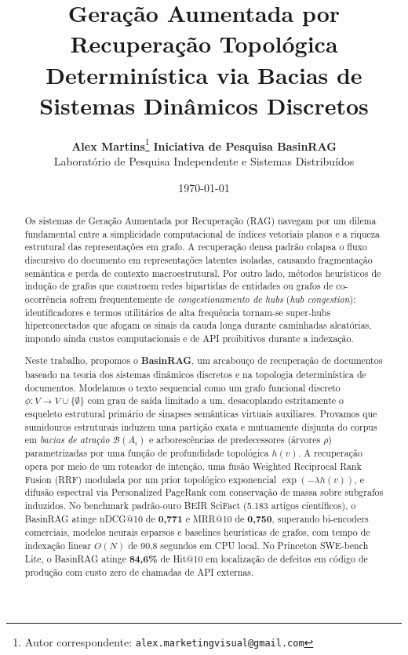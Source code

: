 \documentclass[10pt,twocolumn]{article}
\title{\textbf{Geração Aumentada por Recuperação Topológica Determinística via Bacias de Sistemas Dinâmicos Discretos}}
\author{
    \textbf{Alex Martins}\thanks{Autor correspondente: \texttt{alex.marketingvisual@gmail.com}} \quad \textbf{Iniciativa de Pesquisa BasinRAG} \\
    \small Laboratório de Pesquisa Independente e Sistemas Distribuídos
}
\date{\today}
\theoremstyle{definition}
\begin{document}
\maketitle

\begin{abstract}
Os sistemas de Geração Aumentada por Recuperação (RAG) navegam por um dilema fundamental entre a simplicidade computacional de índices vetoriais planos e a riqueza estrutural das representações em grafo. A recuperação densa padrão colapsa o fluxo discursivo do documento em representações latentes isoladas, causando fragmentação semântica e perda de contexto macroestrutural. Por outro lado, métodos heurísticos de indução de grafos que constroem redes bipartidas de entidades ou grafos de co-ocorrência sofrem frequentemente de \textit{congestionamento de hubs} (\textit{hub congestion}): identificadores e termos utilitários de alta frequência tornam-se super-hubs hiperconectados que afogam os sinais da cauda longa durante caminhadas aleatórias, impondo ainda custos computacionais e de API proibitivos durante a indexação.

Neste trabalho, propomos o \textbf{BasinRAG}, um arcabouço de recuperação de documentos baseado na teoria dos sistemas dinâmicos discretos e na topologia determinística de documentos. Modelamos o texto sequencial como um grafo funcional discreto $\phi: V \to V \cup \{\emptyset\}$ com grau de saída limitado a um, desacoplando estritamente o esqueleto estrutural primário de sinapses semânticas virtuais auxiliares. Provamos que sumidouros estruturais induzem uma partição exata e mutuamente disjunta do corpus em \textit{bacias de atração} $\mathcal{B}(A_i)$ e arborescências de predecessores (árvores $\rho$) parametrizadas por uma função de profundidade topológica $h(v)$. A recuperação opera por meio de um roteador de intenção, uma fusão Weighted Reciprocal Rank Fusion (RRF) modulada por um prior topológico exponencial $\exp(-\lambda h(v))$, e difusão espectral via Personalized PageRank com conservação de massa sobre subgrafos induzidos. No benchmark padrão-ouro BEIR SciFact (5.183 artigos científicos), o BasinRAG atinge nDCG@10 de \textbf{0,771} e MRR@10 de \textbf{0,750}, superando bi-encoders comerciais, modelos neurais esparsos e baselines heurísticas de grafos, com tempo de indexação linear $O(N)$ de 90,8 segundos em CPU local. No Princeton SWE-bench Lite, o BasinRAG atinge \textbf{84,6\%} de Hit@10 em localização de defeitos em código de produção com custo zero de chamadas de API externas.
\end{abstract}
\end{document}
